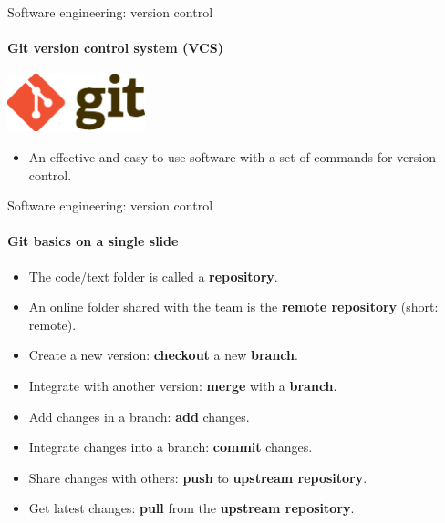 \documentclass[
	aspectratio=169,%
	color={accentcolor=2d},
	logo=true,%
	colorframetitle=true,%
	]{tudabeamer}
\begin{document}
\begin{frame}{Software engineering: version control}
    \framesubtitle{Git version control system (VCS)}

    \vfill
    \begin{center}
        \includegraphics[width=0.3\textwidth]{figures/Git-Logo-2Color.eps}
    \end{center}

    \begin{itemize}
        \item An effective and easy to use software with a set of commands for version control. 
    \end{itemize}

\end{frame}

\begin{frame}{Software engineering: version control}
    \framesubtitle{Git basics on a single slide}

    \vfill
    \begin{itemize}
        \item The code/text folder is called a \textbf{repository}.
        \item An online folder shared with the team is the \textbf{remote repository} (short: remote).
        \item Create a new version: \textbf{checkout} a new \textbf{branch}.  
        \item Integrate with another version: \textbf{merge} with a \textbf{branch}.
        \item Add changes in a branch: \textbf{add} changes.
        \item Integrate changes into a branch: \textbf{commit} changes.
        \item Share changes with others: \textbf{push} to \textbf{upstream repository}. 
        \item Get latest changes: \textbf{pull} from the \textbf{upstream repository}.
    \end{itemize}

\end{frame}
\end{document}
